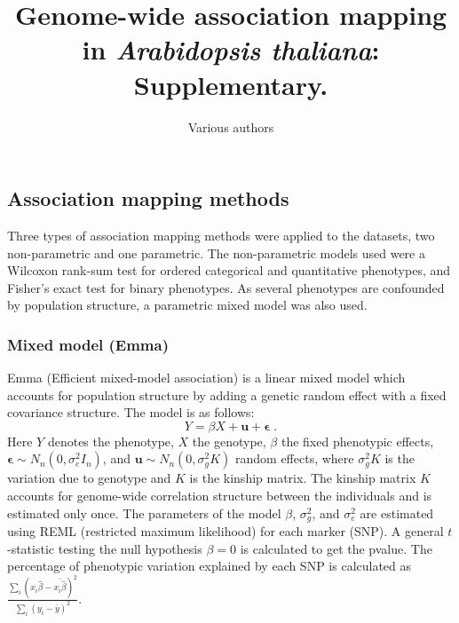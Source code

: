 \documentclass[10pt]{article}
\title{Genome-wide association mapping in \textit{Arabidopsis thaliana}: Supplementary.}
\author{Various authors}
\begin{document}
\maketitle
\begin{comment}
\begin{python}
for i in range(0,10):
    print "bla\\\\"

\end{python}
\end{comment}


\subsection*{Association mapping methods}


Three types of association mapping methods were applied to the datasets, two non-parametric and one parametric.  The non-parametric models used were a Wilcoxon rank-sum test for ordered categorical and quantitative phenotypes, and Fisher's exact test for binary phenotypes.  As several phenotypes are confounded by population structure, a parametric mixed model was also used.


\subsubsection*{Mixed model (Emma)}

Emma (Efficient mixed-model association) \cite{kang08} is a linear mixed model which accounts for population structure by adding a genetic random effect with a fixed covariance structure.  The model is as follows:
\[
    Y = \beta X + \mathbf{u}+\mathbf{\epsilon} \; .
\]
Here $Y$ denotes the phenotype, $X$ the genotype, $\beta$ the fixed phenotypic effects, $\mathbf{\epsilon}\sim N_n(0,\sigma_{e}^2I_n)$, and
$\mathbf{u}\sim N_n(0,\sigma_{g}^2K)$ random effects, where $\sigma_{g}^2K$ is the variation due to genotype and $K$ is the kinship matrix.  The
kinship matrix $K$ accounts for genome-wide correlation structure between the individuals and is estimated only once. The parameters of
the model $\beta$, $\sigma_{g}^2$, and $\sigma_{e}^2$ are estimated using REML (restricted maximum likelihood) for each marker (SNP). A general $t$-statistic testing the null hypothesis $\beta=0$ is calculated to get the pvalue. The percentage of phenotypic variation explained by each SNP is calculated as  $\frac{\sum_{i}(x_i\hat{\beta}-\bar{x_i\hat{\beta}})^2}{\sum_{i}(y_i-\bar{y})^2}$.
\end{document}
